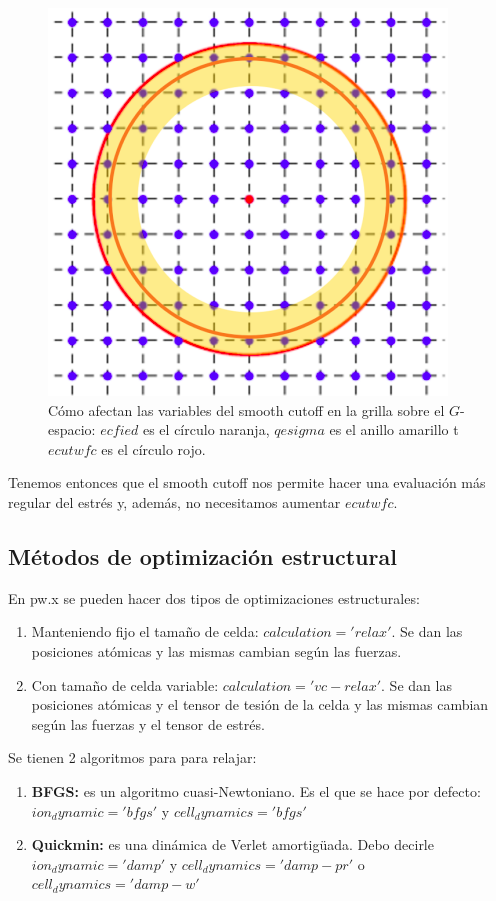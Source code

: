     \begin{figure}[H]
        \centering
        \includegraphics[scale = 0.6]{figs/D3/smooth.png}
        \caption{Cómo afectan las variables del smooth cutoff en la grilla sobre el $G$-espacio: $ecfied$ es el círculo naranja, $qesigma$ es el anillo amarillo t $ecutwfc$ es el círculo rojo.}
        \label{fig:smooth}
    \end{figure}

  Tenemos entonces que el smooth cutoff nos permite hacer una evaluación más regular del estrés y, además, no necesitamos aumentar $ecutwfc$.

\subsection{Métodos de optimización estructural}

  En pw.x se pueden hacer dos tipos de optimizaciones estructurales:
  \begin{enumerate}
    \item Manteniendo fijo el tamaño de celda: $calculation = 'relax'$. Se dan las posiciones atómicas y las mismas cambian según las fuerzas.
    \item Con tamaño de celda variable: $calculation = 'vc-relax'$. Se dan las posiciones atómicas y el tensor de tesión de la celda y las mismas cambian según las fuerzas y el tensor de estrés.
  \end{enumerate}

  Se tienen 2 algoritmos para para relajar:
    \begin{enumerate}
      \item \textbf{BFGS:} es un algoritmo cuasi-Newtoniano. Es el que se hace por defecto: $ion_dynamic='bfgs'$ y $cell_dynamics='bfgs'$
      \item \textbf{Quickmin:} es una dinámica de Verlet amortigüada. Debo decirle $ion_dynamic='damp'$ y $cell_dynamics='damp-pr'$ o $cell_dynamics='damp-w'$
    \end{enumerate}


